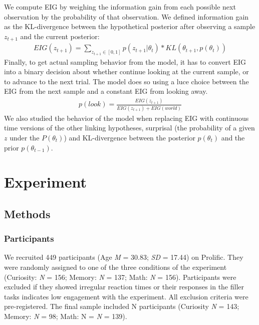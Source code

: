 \documentclass[10pt, letterpaper]{article}
\begin{document}
We compute EIG by weighing the information gain from each possible next
observation by the probability of that observation. We defined
information gain as the KL-divergence between the hypothetical posterior
after observing a sample \(z_{t+1}\) and the current posterior:
\begin{eqnarray}
EIG(z_{t+1}) = \sum_{z_{t+1} \in [0,1]} p(z_{t+1}|\theta_t) * KL(\theta_{t+1}, p(\theta_t))
\end{eqnarray} Finally, to get actual sampling behavior from the model,
it has to convert EIG into a binary decision about whether continue
looking at the current sample, or to advance to the next trial. The
model does so using a luce choice between the EIG from the next sample
and a constant EIG from looking away. \begin{eqnarray}
p(look) = \frac{EIG(z_{t+1})}{EIG(z_{t+1})+EIG(world)}
\end{eqnarray} We also studied the behavior of the model when replacing
EIG with continuous time versions of the other linking hypotheses,
surprisal (the probability of a given \(z\) under the \(P(\theta_t)\))
and KL-divergence between the posterior \(p(\theta_t)\) and the prior
\(p(\theta_{t-1})\).

\hypertarget{experiment}{%
\section{Experiment}\label{experiment}}

\hypertarget{methods}{%
\subsection{Methods}\label{methods}}

\hypertarget{participants}{%
\subsubsection{Participants}\label{participants}}

We recruited 449 participants (Age \emph{M} = 30.83; \emph{SD} = 17.44)
on Prolific. They were randomly assigned to one of the three conditions
of the experiment (Curiosity: \emph{N} = 156; Memory: \emph{N} = 137;
Math: \emph{N} = 156). Participants were excluded if they showed
irregular reaction times or their responses in the filler tasks
indicates low engagement with the experiment. All exclusion criteria
were pre-registered. The final sample included N participants (Curiosity
\emph{N} = 143; Memory: \emph{N} = 98; Math: N = \emph{N} = 139).
\end{document}
